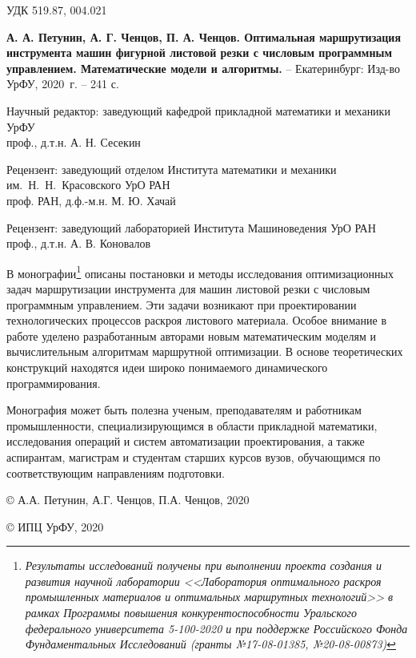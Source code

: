 
\thispagestyle{empty}
{
\setlength{\parindent}{0pt}
\setlength{\parskip}{1em}
\footnotesize

\noindent
УДК 519.87, 004.021

\vspace{3em}

{\bf
А. А. Петунин,
А. Г. Ченцов,
П. А. Ченцов.
Оптимальная маршрутизация инструмента машин фигурной листовой резки
с числовым программным управлением.
Математические модели и алгоритмы.
}
--
Екатеринбург:
Изд-во УрФУ,
2020~г.
--
241 с.

\vspace{2em}

\begin{center}

Научный редактор:
заведующий кафедрой прикладной математики и механики УрФУ
\\
проф., д.т.н. А. Н. Сесекин

Рецензент:
заведующий отделом
Института математики и механики им.~Н.~Н.~Красовского УрО РАН
\\
проф. РАН, д.ф.-м.н. М. Ю. Хачай

Рецензент:
заведующий лабораторией Института Машиноведения УрО РАН
\\
проф., д.т.н. А. В. Коновалов
\end{center}

\vspace{2em}

В монографии\footnote{\it
  Результаты исследований получены при выполнении
  проекта создания и развития научной лаборатории
  <<Лаборатория оптимального раскроя промышленных материалов
  и оптимальных маршрутных технологий>>
  в рамках Программы повышения конкурентоспособности
  Уральского федерального университета
  5-100-2020
  и при поддержке Российского Фонда Фундаментальных Исследований
  (гранты №17-08-01385, №20-08-00873)
}
описаны постановки и методы исследования оптимизационных задач
маршрутизации инструмента для машин листовой резки
с числовым программным управлением.
Эти задачи возникают при проектировании технологических процессов
раскроя листового материала.
Особое внимание в работе уделено разработанным авторами
новым математическим моделям и вычислительным алгоритмам маршрутной оптимизации.
В основе теоретических конструкций находятся идеи
широко понимаемого динамического программирования.

Монография может быть полезна ученым, преподавателям и работникам промышленности,
специализирующимся в области прикладной математики,
исследования операций и систем автоматизации проектирования,
а также аспирантам, магистрам и студентам старших курсов вузов,
обучающимся по соответствующим направлениям подготовки.

\vspace{3em}
{
\setlength{\parindent}{0.5\linewidth}
\setlength{\parskip}{0em}
\scriptsize

\copyright
А.А. Петунин, А.Г. Ченцов, П.А. Ченцов, 2020

\copyright
ИПЦ УрФУ, 2020
}}
